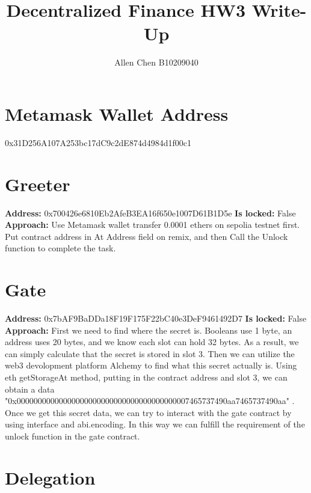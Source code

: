 \documentclass{article}
\title{Decentralized Finance HW3 Write-Up}
\author{Allen Chen B10209040}
\begin{document}
\maketitle

\section*{Metamask Wallet Address}
\centerline{0x31D256A107A253bc17dC9c2dE874d4984d1f00c1}

\section{Greeter}

\begin{spacing}{1.5}
    \textbf{Address:} 0x700426e6810Eb2AfeB3EA16f650e1007D61B1D5e \newline
    \textbf{Is locked:} False \newline
    \textbf{Approach:} Use Metamask wallet transfer 0.0001 ethers on sepolia testnet first. Put contract address in At Address field on remix, and then Call the Unlock function to complete the task.   
\end{spacing}


\section{Gate}

\begin{spacing}{1.5}
    \textbf{Address:} 0x7bAF9BaDDa18F19F175F22bC40e3DeF9461492D7 \newline
    \textbf{Is locked:} False \newline
    \textbf{Approach:} First we need to find where the secret is. Booleans use 1 byte, an address uses 20 bytes, and we know each slot can hold 32 bytes. As a result, we can simply calculate that the secret is stored in slot 3.
    Then we can utilize the web3 devolopment platform Alchemy to find what this secret actually is. Using 
    eth getStorageAt method, putting in the contract address and slot 3, we can obtain a data 
    "0x00000000000000000000000000000000000000007465737490aa7465737490aa" . Once we get this secret data, we can try to interact with the gate contract by using interface and abi.encoding.
    In this way we can fulfill the requirement of the unlock function in the gate contract. 


\end{spacing}

\section{Delegation}
\end{document}
